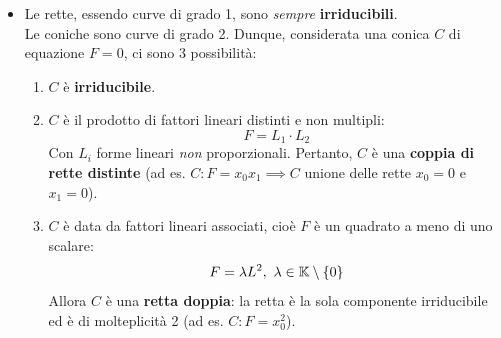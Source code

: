 \begin{examples}
	\begin{itemize}
		\item Le rette, essendo curve di grado 1, sono \textit{sempre} \textbf{irriducibili}.\\
		Le coniche sono curve di grado 2. Dunque, considerata una conica $C$ di equazione $F=0$, ci sono 3 possibilità:
		\begin{enumerate}
			\item	$C$ è \textbf{irriducibile}.
			\item	$C$ è il prodotto di fattori lineari distinti e non multipli:
			\begin{equation}
				F=L_1\cdot L_2
			\end{equation}
			Con $L_i$ forme lineari \textit{non} proporzionali. Pertanto, $C$ è una \textbf{coppia di rette distinte} (ad es. $C\colon F=x_0x_1\implies C$ unione delle rette $x_0=0$ e $x_1=0$).
			\item	$C$ è data da fattori lineari associati, cioè $F$ è un quadrato a meno di uno scalare:
			\begin{equation}
				F=\lambda L^2,\ \lambda\in\kamp\setminus\{0\}
			\end{equation}
			Allora $C$ è una \textbf{retta doppia}: la retta è la sola componente irriducibile ed è di molteplicità 2 (ad es. $C\colon F=x_0^2$).
		\end{enumerate}
	\end{itemize}
\vspace{-3mm}
\end{examples}

